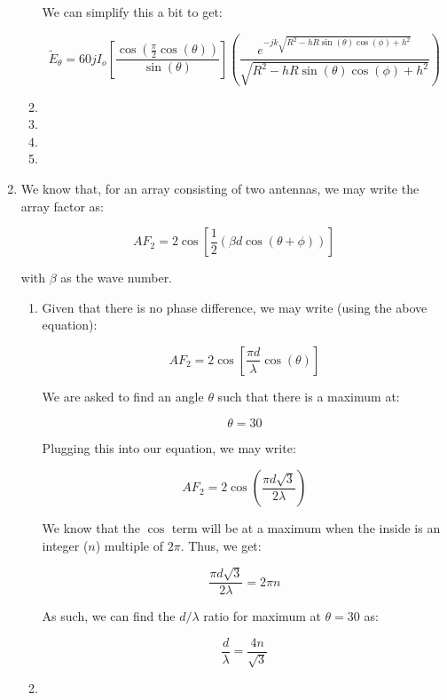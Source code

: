 \begin{enumerate}
\begin{enumerate}
        We can simplify this a bit to get:

        $$\boxed{\tilde{E}_\theta=60jI_o\left[ \frac{\cos\left( \frac{\pi}{2}\cos(\theta) \right)}{\sin(\theta)} \right]\left( \frac{e^{-jk\sqrt{R^2-hR\sin(\theta)\cos(\phi)+h^2}}}{\sqrt{R^2-hR\sin(\theta)\cos(\phi)+h^2}} \right)}$$

      \item 

      \item 

      \item 

      \item 

    \end{enumerate}

  \item 

        We know that, for an array consisting of two antennas, we may write the array factor as:

        $$AF_2=2\cos\left[ \frac{1}{2}\left( \beta d\cos(\theta+\phi) \right) \right]$$

        with $\beta$ as the wave number.
        

    \begin{enumerate}

      \item 

        Given that there is no phase difference, we may write (using the above equation):

        $$AF_2=2\cos\left[ \frac{\pi d}{\lambda}\cos(\theta) \right]$$

        We are asked to find an angle $\theta$ such that there is a maximum at:

        $$\theta=30$$

        Plugging this into our equation, we may write:

        $$AF_2=2\cos\left(\frac{\pi d\sqrt{3}}{2\lambda}\right)$$

        We know that the $\cos$ term will be at a maximum when the inside is an integer ($n$) multiple of $2\pi$. Thus, we get:

        $$\frac{\pi d\sqrt{3}}{2\lambda}=2\pi n$$

        As such, we can find the $d/\lambda$ ratio for maximum at $\theta=30$ as:

        $$\boxed{\frac{d}{\lambda}=\frac{4n}{\sqrt{3}}}$$

      \item 


\end{enumerate}
\end{enumerate}
